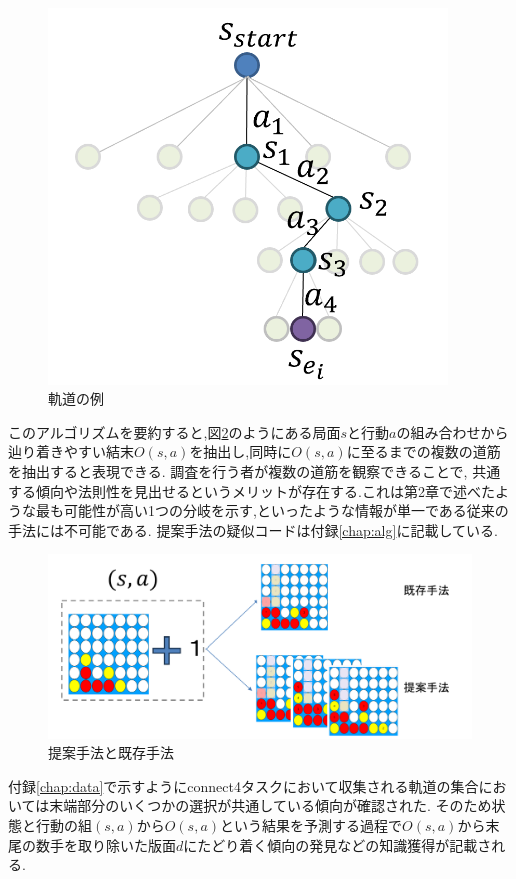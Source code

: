 \begin{figure}[t]
    \centering
    \includegraphics[width=300pt]{./figure/traj-example.png}
    \caption{軌道の例}
    \label{fig:step3-4}
\end{figure}
このアルゴリズムを要約すると,図\ref{fig:merit}のようにある局面$s$と行動$a$の組み合わせから辿り着きやすい結末$O(s, a)$を抽出し,同時に$O(s, a)$に至るまでの複数の道筋を抽出すると表現できる.
調査を行う者が複数の道筋を観察できることで,
共通する傾向や法則性を見出せるというメリットが存在する.これは第2章で述べたような最も可能性が高い1つの分岐を示す,といったような情報が単一である従来の手法には不可能である.
提案手法の疑似コードは付録\ref{chap:alg}に記載している.

\begin{figure}[t]
    \includegraphics[width=400pt]{./figure/merit.png}
	\caption{提案手法と既存手法}
	\label{fig:merit}
\end{figure}




付録\ref{chap:data}で示すようにconnect4タスクにおいて収集される軌道の集合においては末端部分のいくつかの選択が共通している傾向が確認された.
そのため状態と行動の組$(s, a)$から$O(s, a)$という結果を予測する過程で$O(s, a)$から末尾の数手を取り除いた版面$d$にたどり着く傾向の発見などの知識獲得が記載される.
